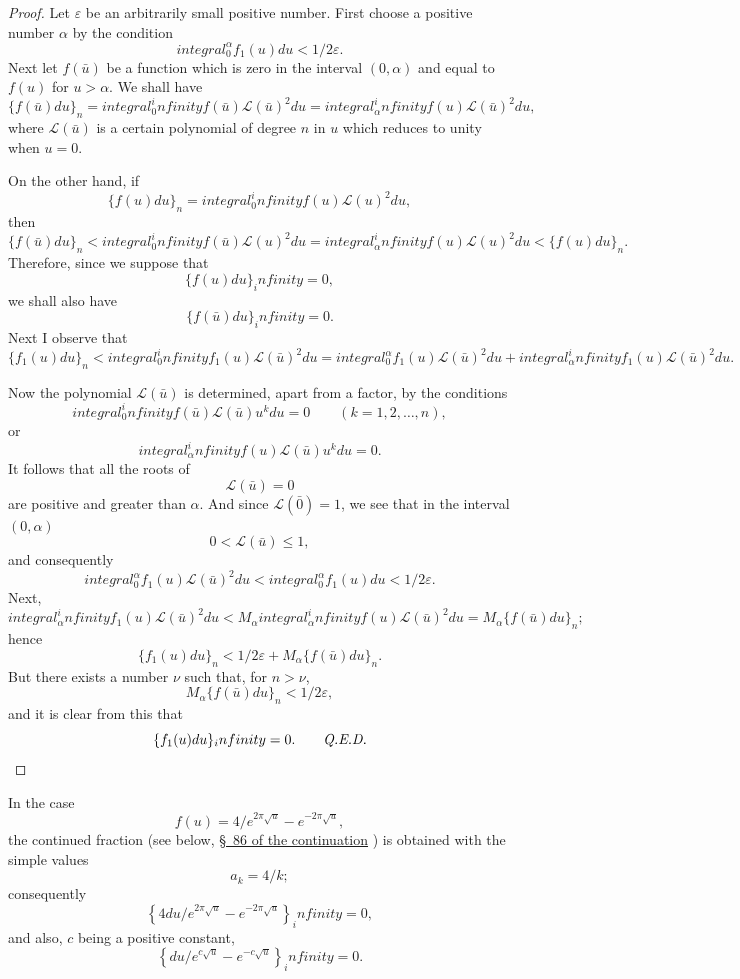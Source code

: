 \documentclass[
  paper=b5,
  fontsize=13pt,
  twoside,
  headings=normal,
  bookmarkpackage=false
]{scrartcl}
\theoremstyle{stieltjesplain}
\theoremstyle{stieltjesdefinition}
\def\int{integral}%
\def\frac#1#2{#1/#2}%
\def\infty{infinity}%
\def\,{ }%
\newcommand{\extsectionref}[1]{%
  \href{https://afst.centre-mersenne.org/articles/10.5802/afst.109/}%
       {\S~#1 of the continuation}%
}
\begin{document}
\begin{proof}
Let $\varepsilon$ be an arbitrarily small positive number. First choose a
positive number $\alpha$ by the condition
\[
  \int_0^\alpha f_1(u)\,du<\frac12\varepsilon.
\]
Next let $f(\bar u)$ be a function which is zero in the interval
$(0,\alpha)$ and equal to $f(u)$ for $u>\alpha$. We shall have
\[
  \{f(\bar u)\,du\}_n
  =\int_0^\infty f(\bar u)\,\mathcal L(\bar u)^2\,du
  =\int_\alpha^\infty f(u)\,\mathcal L(\bar u)^2\,du,
\]
where $\mathcal L(\bar u)$ is a certain polynomial of degree $n$ in $u$
which reduces to unity when $u=0$.

On the other hand, if
\[
  \{f(u)\,du\}_n
  =\int_0^\infty f(u)\,\mathcal L(u)^2\,du,
\]
then
\[
  \{f(\bar u)\,du\}_n
  <\int_0^\infty f(\bar u)\,\mathcal L(u)^2\,du
  =\int_\alpha^\infty f(u)\,\mathcal L(u)^2\,du
  <\{f(u)\,du\}_n.
\]
Therefore, since we suppose that
\[
  \{f(u)\,du\}_\infty=0,
\]
we shall also have
\[
  \{f(\bar u)\,du\}_\infty=0.
\]
Next I observe that
\[
  \{f_1(u)\,du\}_n
  <\int_0^\infty f_1(u)\,\mathcal L(\bar u)^2\,du
  =\int_0^\alpha f_1(u)\,\mathcal L(\bar u)^2\,du
   +\int_\alpha^\infty f_1(u)\,\mathcal L(\bar u)^2\,du.
\]

Now the polynomial $\mathcal L(\bar u)$ is determined, apart from a
factor, by the conditions
\[
  \int_0^\infty f(\bar u)\,\mathcal L(\bar u)u^k\,du=0
  \qquad(k=1,2,\ldots,n),
\]
or
\[
  \int_\alpha^\infty f(u)\,\mathcal L(\bar u)u^k\,du=0.
\]
It follows that all the roots of
\[
  \mathcal L(\bar u)=0
\]
are positive and greater than $\alpha$. And since
$\mathcal L(\bar 0)=1$, we see that in the interval $(0,\alpha)$
\[
  0<\mathcal L(\bar u)\leq1,
\]
and consequently
\[
  \int_0^\alpha f_1(u)\,\mathcal L(\bar u)^2\,du
  <\int_0^\alpha f_1(u)\,du<\frac12\varepsilon.
\]
Next,
\[
  \int_\alpha^\infty f_1(u)\,\mathcal L(\bar u)^2\,du
  <M_\alpha\int_\alpha^\infty
       f(u)\,\mathcal L(\bar u)^2\,du
  =M_\alpha\{f(\bar u)\,du\}_n;
\]
hence
\[
  \{f_1(u)\,du\}_n
  <\frac12\varepsilon+M_\alpha\{f(\bar u)\,du\}_n.
\]
But there exists a number $\nu$ such that, for $n>\nu$,
\[
  M_\alpha\{f(\bar u)\,du\}_n<\frac12\varepsilon,
\]
and it is clear from this that
\begin{equation*}
  \{f_1(u)\,du\}_\infty=0.
  \tag*{\textit{Q.E.D.}}
\end{equation*}
\end{proof}

In the case
\[
  f(u)=\frac{4}{e^{2\pi\sqrt u}-e^{-2\pi\sqrt u}},
\]
the continued fraction (see below, \extsectionref{86}) is obtained with
the simple values
\[
  a_k=\frac4k;
\]
consequently
\[
  \left\{\frac{4\,du}
  {e^{2\pi\sqrt u}-e^{-2\pi\sqrt u}}\right\}_\infty=0,
\]
and also, $c$ being a positive constant,
\[
  \left\{\frac{du}
  {e^{c\sqrt u}-e^{-c\sqrt u}}\right\}_\infty=0.
\]
\end{document}
